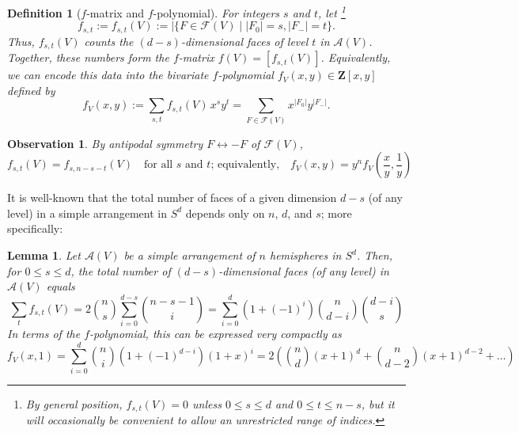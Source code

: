\documentclass[11pt]{article}
\newtheorem{lemma}[theorem]{Lemma}
\newtheorem{observation}[theorem]{Observation}
\newtheorem{definition}[theorem]{Definition}
\newcommand{\arr}{\mathcal{A}}
\newcommand{\fpoly}{f}
\renewcommand{\leq}{\leqslant}
\newcommand{\Z}{\mathbf{Z}}
\begin{document}
%
%
\begin{definition}[$f$-matrix and $f$-polynomial]
\label{def:f-poly}
For integers $s$ and $t$, let%
\footnote{By general position, $f_{s,t}(V)=0$ unless $0\leq s\leq d$ and $0\leq t\leq n-s$, but it will occasionally be convenient to allow an unrestricted range of indices.}
$$
f_{s,t} := f_{s,t}(V):=|\{F\in \mathcal{F}(V)\mid |F_0|=s,|F_-|=t\}.
$$
Thus, $f_{s,t}(V)$ counts the $(d-s)$-dimensional faces of level $t$ in $\arr(V)$. 
%
Together, these numbers form the \emph{$f$-matrix} $f(V)=[f_{s,t}(V)]$. Equivalently, we can encode this data into the bivariate \emph{$f$-polynomial} $\fpoly_V(x,y) \in  \Z[x,y]$ defined by 
$$
f_{V}(x,y) := \sum_{s,t} f_{s,t}(V)\, x^s y^t =\sum_{F\in \mathcal{F}(V)} x^{|F_0|} y^{|F_-|}.
$$
\end{definition}
\begin{observation} 
\label{obs:f-antipodal-symm} By antipodal symmetry $F\leftrightarrow -F$ of $\mathcal{F}(V)$, 
\begin{equation}
\label{eq:f-symm}
f_{s,t}(V)=f_{s,n-s-t}(V) \quad \textrm{for all $s$ and $t$; equivalently,} \textstyle \quad f_V(x,y)= y^n f_V(\frac{x}{y},\frac{1}{y})
\end{equation}
\end{observation}
It is well-known \cite[Sec.~18.1]{Grunbaum:2003aa} that the total number of faces of a given dimension $d-s$ (of any level) in a simple arrangement in $S^d$ depends only on $n$, $d$, and $s$; more specifically:
\begin{lemma}
Let $\arr(V)$ be a simple arrangement of $n$ hemispheres in $S^d$. Then, for $0\leq s\leq d$,
the total number of $(d-s)$-dimensional faces (of any level) in $\arr(V)$ equals
\begin{equation}
\label{eq:total-number-faces}
\sum_t f_{s,t}(V) = 2\binom{n}{s}\sum_{i=0}^{d-s} \binom{n-s-1}{i} = \sum_{i=0}^d (1+(-1)^i)\binom{n}{d-i} \binom{d-i}{s}
\end{equation}
In terms of the $f$-polynomial, this can be expressed very compactly as
\begin{equation}
\label{eq:f-tutte}
\textstyle f_V(x,1) = \sum_{i=0}^d \binom{n}{i}\left(1+(-1)^{d-i}\right)(1+x)^i = 2\left(\binom{n}{d}(x+1)^d + \binom{n}{d-2}(x+1)^{d-2} + \dots\right)
\end{equation}
\end{lemma}
\end{document}

